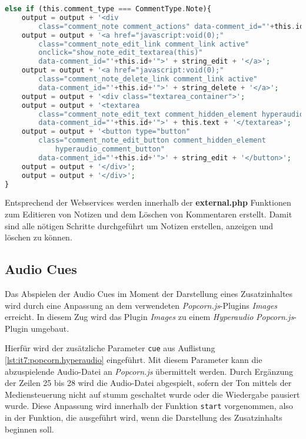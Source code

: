 \begin{lstlisting}[language=php,
             linewidth=\textwidth,
             caption={Ausschnitt der \textbf{hyperaudio.js} in der 6. Iteration},
             label={lst:it6:hyperaudio}]
else if (this.comment_type === CommentType.Note){
    output = output + '<div
        class="comment_note comment_actions" data-comment_id="'+this.id+'">';
    output = output + '<a href="javascript:void(0);"
        class="comment_note_edit_link comment_link active"
        onclick="show_note_edit_textarea(this)"
        data-comment_id="'+this.id+'">' + string_edit + '</a>';
    output = output + '<a href="javascript:void(0);"
        class="comment_note_delete_link comment_link active"
        data-comment_id="'+this.id+'">' + string_delete + '</a>';
    output = output + '<div class="textarea_container">';
    output = output + '<textarea
        class="comment_note_edit_text comment_hidden_element hyperaudio_textarea"
        data-comment_id="'+this.id+'">' + this.text + '</textarea>';
    output = output + '<button type="button"
        class="comment_note_edit_button comment_hidden_element
            hyperaudio_comment_button"
        data-comment_id="'+this.id+'">' + string_edit + '</button>';
    output = output + '</div>';
    output = output + '</div>';
}		
\end{lstlisting}

Entsprechend der Webservices werden innerhalb der \textbf{external.php} Funktionen zum Editieren von Notizen und dem Löschen von Kommentaren erstellt. Damit sind alle nötigen Schritte durchgeführt um Notizen erstellen, anzeigen und löschen zu können.


\subsection{Audio Cues}
Das Abspielen der Audio Cues im Moment der Darstellung eines Zusatzinhaltes wird durch eine Anpassung an dem verwendeten \textit{Popcorn.js}-Plugins \textit{Images} erreicht. In diesem Zug wird das Plugin \textit{Images} zu einem \textit{Hyperaudio} \textit{Popcorn.js}-Plugin umgebaut.

Hierfür wird der zusätzliche Parameter \texttt{cue} aus Auflistung \ref{lst:it7:popcorn.hyperaudio} eingeführt. Mit diesem Parameter kann die abzuspielende Audio-Datei an \textit{Popcorn.js} übermittelt werden. Durch Ergänzung der Zeilen 25 bis 28 wird die Audio-Datei abgespielt, sofern der Ton mittels der Mediensteuerung nicht auf stumm geschaltet wurde oder die Wiedergabe pausiert wurde. Diese Anpassung wird innerhalb der Funktion \texttt{start} vorgenommen, also in der Funktion, die ausgeführt wird, wenn die Darstellung des Zusatzinhalts beginnen soll.

